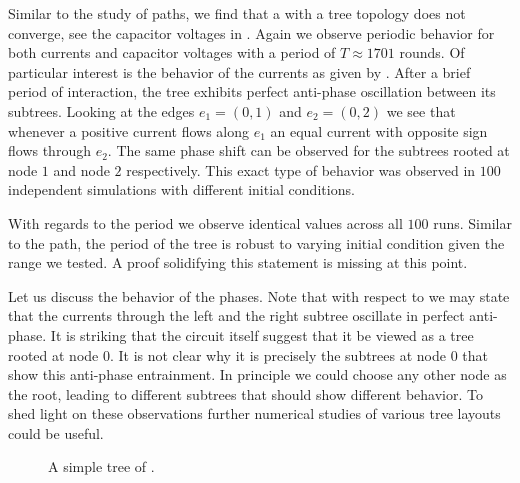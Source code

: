 		Similar to the study of paths, we find that a \Pn with a tree topology does not converge, see the capacitor voltages in . Again we observe periodic behavior for both currents and capacitor voltages with a period of $T \approx 1701$ rounds. Of particular interest is the behavior of the currents as given by . After a brief period of interaction, the tree exhibits perfect anti-phase oscillation between its subtrees. Looking at the edges $e_1 = (0,1)$ and $e_2 = (0,2)$ we see that whenever a positive current flows along $e_1$ an equal current with opposite sign flows through $e_2$. The same phase shift can be observed for the subtrees rooted at node $1$ and node $2$ respectively. This exact type of behavior was observed in $100$ independent simulations with different initial conditions.

		With regards to the period we observe identical values across all $100$ runs. Similar to the path, the period of the tree is robust to varying initial condition given the range we tested. A proof solidifying this statement is missing at this point.

		Let us discuss the behavior of the phases. Note that with respect to  we may state that the currents through the left and the right subtree oscillate in perfect anti-phase. It is striking that the circuit itself suggest that it be viewed as a tree rooted at node $0$. It is not clear why it is precisely the subtrees at node $0$ that show this anti-phase entrainment. In principle we could choose any other node as the root, leading to different subtrees that should show different behavior. To shed light on these observations further numerical studies of various tree layouts could be useful.

		\begin{figure}
			\centering
			\qquad
			\newline
			\qquad
			
					
			\caption[Simulation - Trees]{A simple tree of \Pes.}
			\label{fig:tree}
		\end{figure}

